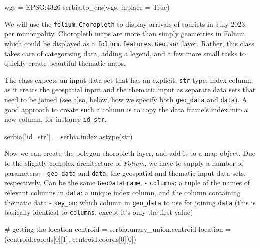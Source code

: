 \documentclass[
  letterpaper,
  DIV=11,
  numbers=noendperiod]{scrreprt}
\newenvironment{Shaded}{\begin{snugshade}}{\end{snugshade}}
\newcommand{\BuiltInTok}[1]{\textcolor[rgb]{0.00,0.23,0.31}{#1}}
\newcommand{\CommentTok}[1]{\textcolor[rgb]{0.37,0.37,0.37}{#1}}
\newcommand{\DecValTok}[1]{\textcolor[rgb]{0.68,0.00,0.00}{#1}}
\newcommand{\NormalTok}[1]{\textcolor[rgb]{0.00,0.23,0.31}{#1}}
\newcommand{\OperatorTok}[1]{\textcolor[rgb]{0.37,0.37,0.37}{#1}}
\newcommand{\StringTok}[1]{\textcolor[rgb]{0.13,0.47,0.30}{#1}}
\newcommand{\VariableTok}[1]{\textcolor[rgb]{0.07,0.07,0.07}{#1}}
\begin{document}
\begin{Shaded}
\begin{Highlighting}[]
\NormalTok{wgs }\OperatorTok{=} \StringTok{\textquotesingle{}EPSG:4326\textquotesingle{}}
\NormalTok{serbia.to\_crs(wgs, inplace }\OperatorTok{=} \VariableTok{True}\NormalTok{)}
\end{Highlighting}
\end{Shaded}

We will use the \texttt{folium.Choropleth} to display arrivals of
tourists in July 2023, per municipality. Choropleth maps are more than
simply geometries in Folium, which could be displayed as a
\texttt{folium.features.GeoJson} layer. Rather, this class takes care of
categorising data, adding a legend, and a few more small tasks to
quickly create beautiful thematic maps.

The class expects an input data set that has an explicit,
\texttt{str}-type, index column, as it treats the geospatial input and
the thematic input as separate data sets that need to be joined (see
also, below, how we specify both \texttt{geo\_data} and \texttt{data}).
A good approach to create such a column is to copy the data frame's
index into a new column, for instance \texttt{id\_str}.

\begin{Shaded}
\begin{Highlighting}[]
\NormalTok{serbia[}\StringTok{"id\_str"}\NormalTok{] }\OperatorTok{=}\NormalTok{ serbia.index.astype(}\BuiltInTok{str}\NormalTok{)}
\end{Highlighting}
\end{Shaded}

Now we can create the polygon choropleth layer, and add it to a map
object. Due to the slightly complex architecture of \emph{Folium}, we
have to supply a number of parameters: - \texttt{geo\_data} and
\texttt{data}, the geospatial and thematic input data sets,
respectively. Can be the same \texttt{GeoDataFrame}. - \texttt{columns}:
a tuple of the names of relevant columns in \texttt{data}: a unique
index column, and the column containing thematic data -
\texttt{key\_on}: which column in \texttt{geo\_data} to use for joining
\texttt{data} (this is basically identical to \texttt{columns}, except
it's only the first value)

\begin{Shaded}
\begin{Highlighting}[]
\CommentTok{\# getting the location}
\NormalTok{centroid }\OperatorTok{=}\NormalTok{ serbia.unary\_union.centroid}
\NormalTok{location }\OperatorTok{=}\NormalTok{ (centroid.coords[}\DecValTok{0}\NormalTok{][}\DecValTok{1}\NormalTok{], centroid.coords[}\DecValTok{0}\NormalTok{][}\DecValTok{0}\NormalTok{])}
\end{Highlighting}
\end{Shaded}
\end{document}
